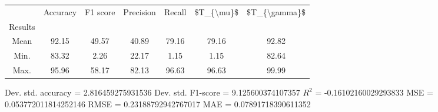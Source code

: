 \begin{tabular}{|c|c|c|c|c|c|c|}
\toprule
{} &  Accuracy &  F1 score &  Precision &  Recall &  \$T\_\{\textbackslash mu\}\$ &  \$T\_\{\textbackslash gamma\}\$ \\
Results &           &           &            &         &            &               \\
\hline
Mean    &     92.15 &     49.57 &      40.89 &   79.16 &      79.16 &         92.82 \\
Min.    &     83.32 &      2.26 &      22.17 &    1.15 &       1.15 &         82.64 \\
Max.    &     95.96 &     58.17 &      82.13 &   96.63 &      96.63 &         99.99 \\
\bottomrule
\end{tabular}

 Dev. std. accuracy = 2.816459275931536
 Dev. std. F1-score = 9.125600374107357
 $R^2$ = -0.16102160029293833
 MSE = 0.053772011814252146
 RMSE = 0.23188792942767017
 MAE = 0.07891718390611352